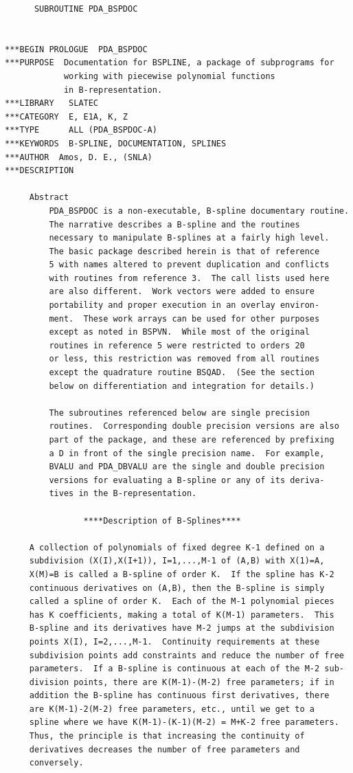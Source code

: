 \documentclass[11pt,twoside]{article}
\begin{document}
\begin{verbatim}
      SUBROUTINE PDA_BSPDOC


***BEGIN PROLOGUE  PDA_BSPDOC
***PURPOSE  Documentation for BSPLINE, a package of subprograms for
            working with piecewise polynomial functions
            in B-representation.
***LIBRARY   SLATEC
***CATEGORY  E, E1A, K, Z
***TYPE      ALL (PDA_BSPDOC-A)
***KEYWORDS  B-SPLINE, DOCUMENTATION, SPLINES
***AUTHOR  Amos, D. E., (SNLA)
***DESCRIPTION

     Abstract
         PDA_BSPDOC is a non-executable, B-spline documentary routine.
         The narrative describes a B-spline and the routines
         necessary to manipulate B-splines at a fairly high level.
         The basic package described herein is that of reference
         5 with names altered to prevent duplication and conflicts
         with routines from reference 3.  The call lists used here
         are also different.  Work vectors were added to ensure
         portability and proper execution in an overlay environ-
         ment.  These work arrays can be used for other purposes
         except as noted in BSPVN.  While most of the original
         routines in reference 5 were restricted to orders 20
         or less, this restriction was removed from all routines
         except the quadrature routine BSQAD.  (See the section
         below on differentiation and integration for details.)

         The subroutines referenced below are single precision
         routines.  Corresponding double precision versions are also
         part of the package, and these are referenced by prefixing
         a D in front of the single precision name.  For example,
         BVALU and PDA_DBVALU are the single and double precision
         versions for evaluating a B-spline or any of its deriva-
         tives in the B-representation.

                ****Description of B-Splines****

     A collection of polynomials of fixed degree K-1 defined on a
     subdivision (X(I),X(I+1)), I=1,...,M-1 of (A,B) with X(1)=A,
     X(M)=B is called a B-spline of order K.  If the spline has K-2
     continuous derivatives on (A,B), then the B-spline is simply
     called a spline of order K.  Each of the M-1 polynomial pieces
     has K coefficients, making a total of K(M-1) parameters.  This
     B-spline and its derivatives have M-2 jumps at the subdivision
     points X(I), I=2,...,M-1.  Continuity requirements at these
     subdivision points add constraints and reduce the number of free
     parameters.  If a B-spline is continuous at each of the M-2 sub-
     division points, there are K(M-1)-(M-2) free parameters; if in
     addition the B-spline has continuous first derivatives, there
     are K(M-1)-2(M-2) free parameters, etc., until we get to a
     spline where we have K(M-1)-(K-1)(M-2) = M+K-2 free parameters.
     Thus, the principle is that increasing the continuity of
     derivatives decreases the number of free parameters and
     conversely.


\end{verbatim}
\end{document}
